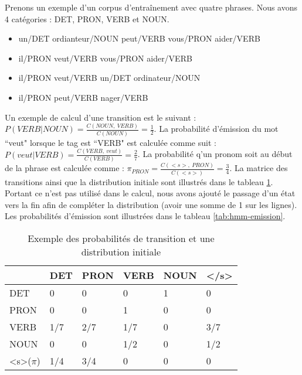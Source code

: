 \documentclass{KodeBook}
\begin{document}
Prenons un exemple d'un corpus d'entraînement avec quatre phrases. 
Nous avons 4 catégories : DET, PRON, VERB et NOUN. 
\begin{itemize}
	\item un/DET ordianteur/NOUN peut/VERB vous/PRON aider/VERB
	\item il/PRON veut/VERB vous/PRON aider/VERB
	\item il/PRON veut/VERB un/DET ordinateur/NOUN
	\item il/PRON peut/VERB nager/VERB
\end{itemize}
Un exemple de calcul d'une transition est le suivant : $P(VERB | NOUN) = \frac{C(NOUN,\ VERB)}{C(NOUN)} = \frac{1}{2}$. 
La probabilité d'émission du mot ``veut" lorsque le tag est ``VERB" est calculée comme suit : $P(veut | VERB) = \frac{C(VERB,\ veut)}{C(VERB)} = \frac{2}{7}$. 
La probabilité q'un pronom soit au début de la phrase est calculée comme : $\pi_{PRON} = \frac{C(<s>,\ PRON)}{C(<s>)} = \frac{3}{4} $.
La matrice des transitions ainsi que la distribution initiale sont illustrés dans le tableau \ref{tab:hmm-trans-init}. 
Portant ce n'est pas utilisé dans le calcul, nous avons ajouté le passage d'un état vers la fin afin de compléter la distribution (avoir une somme de 1 sur les lignes). 
Les probabilités d'émission sont illustrées dans le tableau \ref{tab:hmm-emission}. 
\begin{table}[ht]
	\centering
\begin{tabular}{llllll}
	\cline{2-6}\noalign{\vskip\doublerulesep
		\vskip-\arrayrulewidth}\cline{2-6}
	     & DET & PRON & VERB & NOUN & \textless/s\textgreater\\
	\hline
	DET  &  0  &  0   &  0   &   1  &  0  \\
	PRON &  0  &  0   &   1  &  0   &  0  \\
	VERB & 1/7 & 2/7  & 1/7  &  0   & 3/7 \\
	NOUN &  0  &  0   & 1/2  &   0  &  1/2 \\
	\hline
	\textless s\textgreater ($\pi$) &  1/4  &  3/4   & 0  &   0  &  0 \\
	\hline\hline
\end{tabular}
\caption[Exemple des probabilités de transition et une distribution initiale]{Exemple des probabilités de transition et une distribution initiale \label{tab:hmm-trans-init}}
\end{table}
\end{document}
